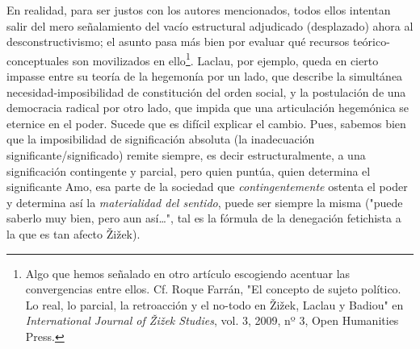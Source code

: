 En realidad, para ser justos con los autores mencionados, todos ellos
intentan salir del mero señalamiento del vacío estructural adjudicado
(desplazado) ahora al desconstructivismo; el asunto pasa más bien por
evaluar qué recursos teórico-conceptuales son movilizados en
ello\footnote{Algo que hemos señalado en otro artículo escogiendo
  acentuar las convergencias entre ellos. Cf. Roque Farrán, "El concepto
  de sujeto político. Lo real, lo parcial, la retroacción y el no-todo
  en Žižek, Laclau y Badiou" en \emph{International Journal of Žižek
  Studies}, vol. 3, 2009, nº 3, Open Humanities Press.}. Laclau, por
ejemplo, queda en cierto impasse entre su teoría de la hegemonía por un
lado, que describe la simultánea necesidad-imposibilidad de constitución
del orden social, y la postulación de una democracia radical por otro
lado, que impida que una articulación hegemónica se eternice en el
poder. Sucede que es difícil explicar el cambio. Pues, sabemos bien que
la imposibilidad de significación absoluta (la inadecuación
significante/significado) remite siempre, es decir estructuralmente, a
una significación contingente y parcial, pero quien puntúa, quien
determina el significante Amo, esa parte de la sociedad que
\emph{contingentemente} ostenta el poder y determina así la
\emph{materialidad del sentido}, puede ser siempre la misma ("puede
saberlo muy bien, pero aun así\ldots", tal es la fórmula de la
denegación fetichista a la que es tan afecto Žižek).

